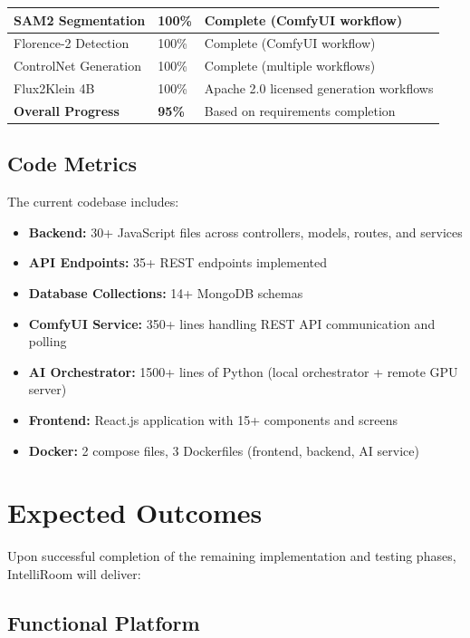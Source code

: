 \begin{table}[htbp]
\begin{tabularx}{\textwidth}{|p{4cm}|p{2cm}|X|}
        \hline
        SAM2 Segmentation & 100\% & Complete (ComfyUI workflow) \\
        \hline
        Florence-2 Detection & 100\% & Complete (ComfyUI workflow) \\
        \hline
        ControlNet Generation & 100\% & Complete (multiple workflows) \\
        \hline
        Flux2Klein 4B & 100\% & Apache 2.0 licensed generation workflows \\
        \hline
        \textbf{Overall Progress} & \textbf{95\%} & Based on requirements completion \\
        \hline
    \end{tabularx}
\end{table}

\subsection{Code Metrics}

The current codebase includes:
\begin{itemize}
    \item \textbf{Backend:} 30+ JavaScript files across controllers, models, routes, and services
    \item \textbf{API Endpoints:} 35+ REST endpoints implemented
    \item \textbf{Database Collections:} 14+ MongoDB schemas
    \item \textbf{ComfyUI Service:} 350+ lines handling REST API communication and polling
    \item \textbf{AI Orchestrator:} 1500+ lines of Python (local orchestrator + remote GPU server)
    \item \textbf{Frontend:} React.js application with 15+ components and screens
    \item \textbf{Docker:} 2 compose files, 3 Dockerfiles (frontend, backend, AI service)
\end{itemize}

\section{Expected Outcomes}
\label{sec:outcomes}

Upon successful completion of the remaining implementation and testing phases, IntelliRoom will deliver:

\subsection{Functional Platform}

